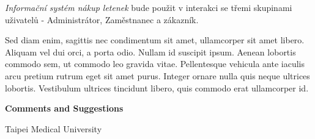 \documentclass[
paper=landscape,
paper=160mm:90mm, %
fontsize=11pt, %
pagesize, %
parskip=half-, %
]{scrartcl} %
\newcommand*{\mygreen}[1]{\textcolor{mygreen}{#1}}
\newcommand*{\myblue}[1]{\textcolor{myblue}{#1}}
\newcommand*{\mybrown}[1]{\textcolor{mybrown}{#1}}
\newcommand*{\myred}[1]{\textcolor{myred}{#1}}
\theoremstyle{mythmstyle} %
\newcommand*{\myauthor}{Tex Li-Hsing Chi} %
\newcommand*{\mydate}{\today} %
\newcommand*{\myuni}{Taipei Medical University} %
\begin{document}
\textit{Informační systém nákup letenek} bude použit v interakci se třemi skupinami uživatelů - Administrátor, Zaměstnanec a zákazník. 

\begin{multicols}{3} %
\mygreen{Sed diam enim, sagittis nec} condimentum sit amet, ullamcorper sit amet libero. \mybrown{Aliquam vel dui orci}, a porta odio. \myred{Nullam id suscipit} ipsum. \myblue{Aenean lobortis} commodo sem, ut commodo leo gravida vitae. Pellentesque vehicula ante iaculis arcu pretium rutrum eget sit amet purus. Integer ornare nulla quis neque ultrices lobortis. Vestibulum ultrices tincidunt libero, quis commodo erat ullamcorper id.
\end{multicols}

\clearpage
\thispagestyle{empty} %




\clearpage


\thispagestyle{empty} %

\begin{flushright}
  \vspace{1.6cm}
  \color{white}\sffamily
  {\bfseries\Large Comments and Suggestions\par}%
  \vspace{0.5cm}
  \normalsize
  \myuni\par
  \vfill
\end{flushright}

%
\end{document}

